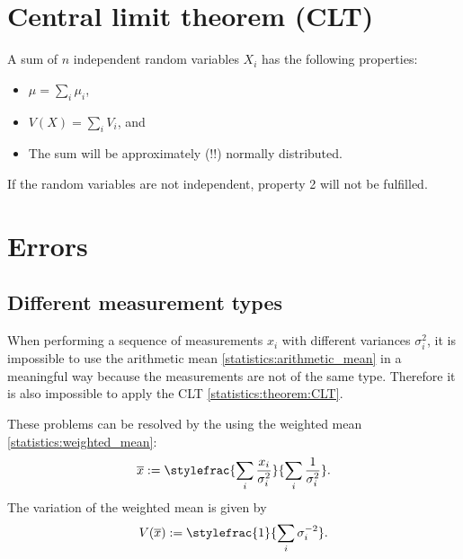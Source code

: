 {\section{Central limit theorem (CLT)}

    \begin{theorem}\label{statistics:theorem:CLT}
        A sum of $n$ independent random variables $X_i$ has the following properties:
        \begin{itemize}
            \item $\mu = \sum_i\mu_i$,
            \item $V(X) = \sum_iV_i$, and
            \item The sum will be approximately (!!) normally distributed.
        \end{itemize}
    \end{theorem}
    \begin{remark}
        If the random variables are not independent, property 2 will not be fulfilled.
    \end{remark}

\section{Errors}


\subsection{Different measurement types}

    When performing a sequence of measurements $x_i$ with different variances $\sigma_i^2$, it is impossible to use the arithmetic mean \ref{statistics:arithmetic_mean} in a meaningful way because the measurements are not of the same type. Therefore it is also impossible to apply the CLT \ref{statistics:theorem:CLT}.

    These problems can be resolved by the using the weighted mean \ref{statistics:weighted_mean}:
    \begin{gather}
        \overline{x} := \stylefrac{\sum_i\frac{x_i}{\sigma_i^2}}{\sum_i\frac{1}{\sigma_i^2}}.
    \end{gather}
    The variation of the weighted mean is given by
    \begin{gather}
        \label{statistics:weighted_mean_variance}
        V(\overline{x}) := \stylefrac{1}{\sum_i\sigma_i^{-2}}.
    \end{gather}

}
